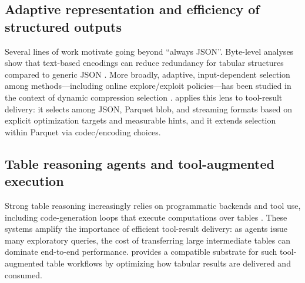 \subsection{Adaptive representation and efficiency of structured outputs}
Several lines of work motivate going beyond ``always JSON''. Byte-level analyses show that text-based encodings can reduce redundancy for tabular structures compared to generic JSON \cite{toonVsJsonModel}. More broadly, adaptive, input-dependent selection among methods---including online explore/exploit policies---has been studied in the context of dynamic compression selection \cite{adaedge}. \system applies this lens to tool-result delivery: it selects among JSON, Parquet blob, and streaming formats based on explicit optimization targets and measurable hints, and it extends selection within Parquet via codec/encoding choices.

\subsection{Table reasoning agents and tool-augmented execution}
Strong table reasoning increasingly relies on programmatic backends and tool use, including code-generation loops that execute computations over tables \cite{tablemindWsdm2026}. These systems amplify the importance of efficient tool-result delivery: as agents issue many exploratory queries, the cost of transferring large intermediate tables can dominate end-to-end performance. \system provides a compatible substrate for such tool-augmented table workflows by optimizing how tabular results are delivered and consumed.